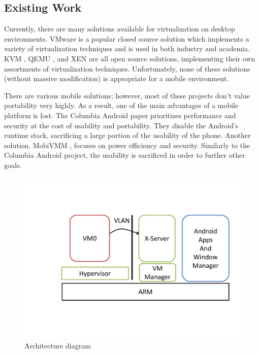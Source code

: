 \subsection{Existing Work}
Currently, there are many solutions available for virtualization on desktop environments.  VMware is a popular closed source solution which implements a variety of virtualization techniques and is used in both industry and academia.  KVM \cite{kvm}, QEMU \cite{qemu}, and XEN \cite{xen} are all open source solutions, implementing their own assortments of virtualization techniques.  Unfortunately, none of these solutions (without massive modification) is appropriate for a mobile environment.

There are various mobile solutions; however, most of these projects don't value portability very highly.  As a result, one of the main advantages of a mobile platform is lost.  The Columbia Android paper prioritizes performance and security at the cost of usability and portability. They disable the Android's runtime stack, sacrificing a large portion of the usability of the phone.  Another solution, MobiVMM \cite{mobivmm}, focuses on power efficiency and security.  Similarly to the Columbia Android project, the usability is sacrificed in order to further other goals.

\begin{figure}[bh]
\centering
\includegraphics[width=1.0\columnwidth]{arch}
\caption{Architecture diagram}
\label{fig:arch}
\end{figure}

